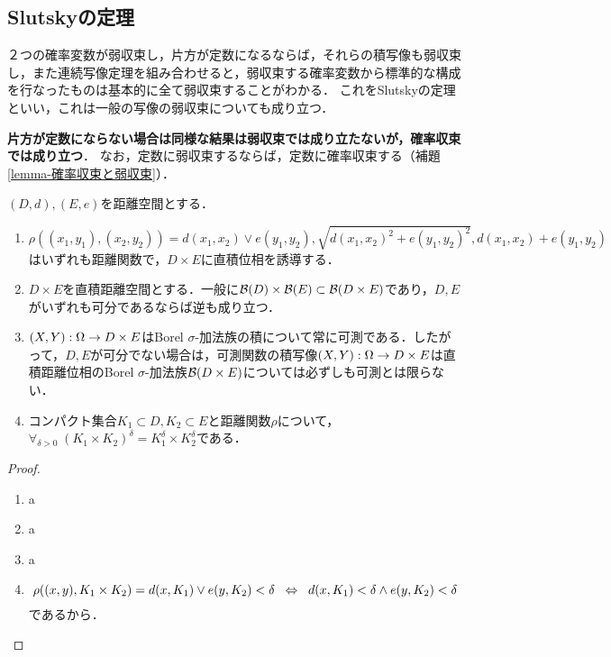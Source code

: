 \documentclass[uplatex,dvipdfmx]{jsreport}
\begin{document}
\subsection{Slutskyの定理}

\begin{tcolorbox}[colframe=ForestGreen, colback=ForestGreen!10!white,breakable,colbacktitle=ForestGreen!40!white,coltitle=black,fonttitle=\bfseries\sffamily,
title=Prokhorovの定理で迂回できる]
    ２つの確率変数が弱収束し，片方が定数になるならば，それらの積写像も弱収束し，また連続写像定理を組み合わせると，弱収束する確率変数から標準的な構成を行なったものは基本的に全て弱収束することがわかる．
    これをSlutskyの定理といい，これは一般の写像の弱収束についても成り立つ．

    \textbf{片方が定数にならない場合は同様な結果は弱収束では成り立たないが，確率収束では成り立つ}．
    なお，定数に弱収束するならば，定数に確率収束する（補題\ref{lemma-確率収束と弱収束}）．
\end{tcolorbox}

\begin{lemma}[直積距離空間]\label{lemma-product-metric-space}
    $(D,d),(E,e)$を距離空間とする．
    \begin{enumerate}
        \item $\rho((x_1,y_1),(x_2,y_2))=d(x_1,x_2)\lor e(y_1,y_2),\sqrt{d(x_1,x_2)^2+e(y_1,y_2)^2},d(x_1,x_2)+e(y_1,y_2)$はいずれも距離関数で，$D\times E$に直積位相を誘導する．
        \item $D\times E$を直積距離空間とする．一般に$\mathcal{B}(D)\times\mathcal{B}(E)\subset\mathcal{B}(D\times E)$であり，$D,E$がいずれも可分であるならば逆も成り立つ．
        \item $(X,Y):\Omega\to D\times E$はBorel $\sigma$-加法族の積について常に可測である．したがって，$D,E$が可分でない場合は，可測関数の積写像$(X,Y):\Omega\to D\times E$は直積距離位相のBorel $\sigma$-加法族$\mathcal{B}(D\times E)$については必ずしも可測とは限らない．
        \item コンパクト集合$K_1\subset D,K_2\subset E$と距離関数$\rho$について，$\forall_{\delta>0}\;(K_1\times K_2)^\delta=K_1^\delta\times K_2^\delta$である．
    \end{enumerate}
\end{lemma}
\begin{proof}\mbox{}
    \begin{enumerate}
        \item a
        \item a
        \item a
        \item 
        \[\rho((x,y),K_1\times K_2)=d(x,K_1)\lor e(y,K_2)<\delta\;\;\Leftrightarrow\;\; d(x,K_1)<\delta\land e(y,K_2)<\delta\]
        であるから．
    \end{enumerate}
\end{proof}
\end{document}
